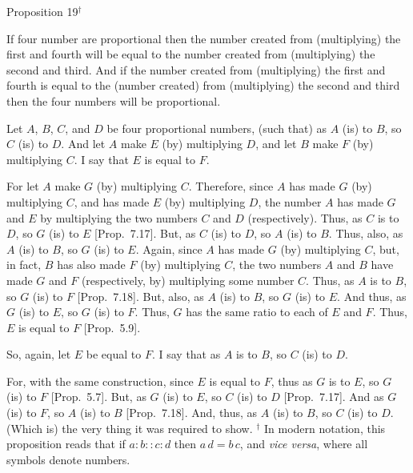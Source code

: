 
\begin{center}
{\large Proposition 19}$^\dag$
\end{center}

If four number are proportional then the number
created from (multiplying) the first and fourth will be equal to the number
created from (multiplying) the second and third. And if the number
created from (multiplying) the first and fourth is equal to the
(number created) from (multiplying) the second and third then the
four numbers will be proportional.

Let $A$, $B$, $C$, and $D$ be four proportional numbers, (such that) as $A$ (is) to
$B$, so $C$ (is) to $D$. And let $A$ make $E$ (by) multiplying $D$, and let
$B$ make $F$ (by) multiplying $C$. I say that $E$ is equal to $F$.

\epsfysize=2in
\centerline{}

For let $A$ make $G$ (by) multiplying $C$. Therefore, since $A$ has made
$G$ (by) multiplying $C$, and has made $E$ (by) multiplying $D$, the number $A$
has made  $G$ and $E$ by multiplying the two numbers $C$ and $D$ (respectively).
Thus, as $C$ is to $D$, so $G$ (is) to $E$  [Prop.~7.17].
But, as $C$ (is) to $D$, so $A$ (is) to $B$. Thus, also, as $A$ (is) to $B$, so
$G$ (is) to $E$. Again, since $A$ has made $G$ (by) multiplying
$C$, but, in fact,  $B$ has also made $F$ (by)  multiplying $C$, the two
numbers $A$ and 
$B$ have made $G$ and $F$ (respectively, by) multiplying some
number $C$. Thus, as $A$ is to $B$, so $G$ (is) to $F$ [Prop.~7.18]. But, also, as $A$ (is) to $B$, so
$G$ (is) to $E$. And thus,  as $G$ (is) to $E$, so $G$ (is) to $F$. Thus, $G$ has the same
ratio to each of $E$ and $F$. Thus, $E$ is equal to $F$ [Prop.~5.9].

So, again, let $E$ be equal to $F$. I say that as $A$ is to $B$, so
$C$  (is) to $D$.

For, with the same construction, since $E$ is equal to $F$, thus as
$G$ is to $E$, so $G$ (is) to $F$  [Prop.~5.7].
But, as $G$ (is) to $E$, so $C$ (is) to $D$ [Prop.~7.17].
And as $G$ (is) to $F$, so $A$ (is) to $B$ [Prop.~7.18].
And, thus, as $A$ (is) to $B$, so $C$ (is) to $D$. (Which is) the very thing it
was required to show.
{\footnotesize\noindent$^\dag$ In modern notation,  this
proposition reads that if $a:b::c:d$ then $a\,d=b\,c$, and
{\em vice versa}, where all symbols denote numbers.}

